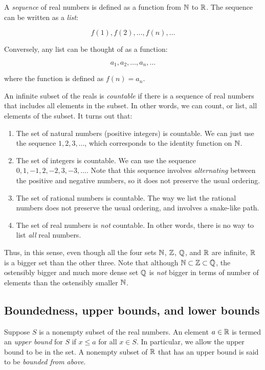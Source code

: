 \documentclass{amsart}
\begin{document}
A {\em sequence} of real numbers is defined as a function from $\mathbb{N}$ to
$\mathbb{R}$. The sequence can be written as a {\em list}:

$$f(1), f(2), \dots, f(n), \dots$$

Conversely, any list can be thought of as a function:

$$a_1, a_2, \dots, a_n, \dots$$

where the function is defined as $f(n) = a_n$.

An infinite subset of the reals is {\em countable} if there is a
sequence of real numbers that includes all elements in the subset. In
other words, we can count, or list, all elements of the subset. It
turns out that:

\begin{enumerate}
\item The set of natural numbers (positive integers) is countable. We
  can just use the sequence $1,2,3,\dots$, which corresponds to the
  identity function on $\mathbb{N}$.
\item The set of integers is countable. We can use the sequence
  $0,1,-1,2,-2,3,-3,\dots$. Note that this sequence involves {\em
  alternating} between the positive and negative numbers, so it does
  not preserve the usual ordering.
\item The set of rational numbers is countable. The way we list the
  rational numbers does not preserve the usual ordering, and involves
  a snake-like path.
\item The set of real numbers is {\em not} countable. In other words,
  there is no way to list {\em all} real numbers.
\end{enumerate}

Thus, in this sense, even though all the four sets $\mathbb{N}$, $\mathbb{Z}$, $\mathbb{Q}$,
and $\mathbb{R}$ are infinite, $\mathbb{R}$ is a bigger set than the other three. Note
that although $\mathbb{N} \subset \mathbb{Z} \subset \mathbb{Q}$, the ostensibly bigger and
much more dense set $\mathbb{Q}$ is {\em not} bigger in terms of number of
elements than the ostensibly smaller $\mathbb{N}$.

\subsection{Boundedness, upper bounds, and lower bounds}

Suppose $S$ is a nonempty subset of the real numbers. An element $a
\in \mathbb{R}$ is termed an {\em upper bound} for $S$ if $x \le a$ for all $x
\in S$. In particular, we allow the upper bound to be in the set. A
nonempty subset of $\mathbb{R}$ that has an upper bound is said to be {\em
bounded from above}.
\end{document}
